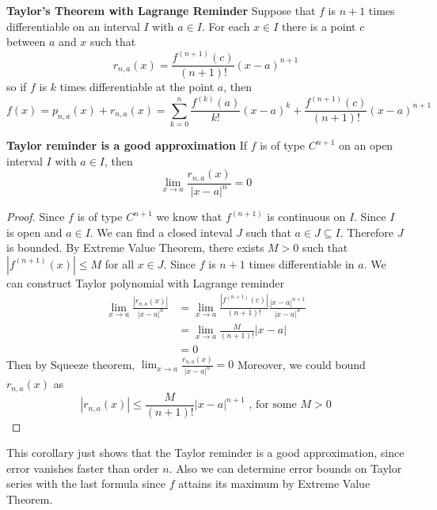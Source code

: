 \documentclass[11pt]{article}
\begin{document}
\begin{theorem*}
  \label{Taylor's Theorem with Lagrange Reminder} \textbf{Taylor's Theorem with Lagrange Reminder} Suppose that $f$ is $n+1$ times differentiable on an interval $I$ with $a\in I$. For each $x\in I$ there is a point $c$ between $a$ and $x$ such that
  \[
    r_{n,a}(x) = \frac{f^{(n+1)}(c)}{(n+1)!} (x-a)^{n+1}
  \]
  so if $f$ is $k$ times differentiable at the point $a$, then
  \[
    f(x) = p_{n, a}(x) + r_{n, a}(x) = \sum_{k=0}^{n} \frac{f^{(k)}(a)}{k!} (x-a)^k + \frac{f^{(n+1)}(c)}{(n+1)!} (x-a)^{n+1}
  \]
\end{theorem*}

\begin{corollary*}
  \textbf{Taylor reminder is a good approximation} If $f$ is of type $C^{n+1}$ on an open interval $I$ with $a\in I$, then
  \[
  \lim_{x\to a} \frac{r_{n, a}(x)}{| x-a |^n} = 0
  \]

  \begin{proof}
    Since $f$ is of type $C^{n+1}$ we know that $f^{(n+1)}$ is continuous on $I$. Since $I$ is open and $a\in I$. We can find a closed inteval $J$ such that $a\in J\subseteq I$. Therefore $J$ is bounded. By Extreme Value Theorem, there exists $M > 0$ such that $|f^{(n+1)} (x)| \leq M$ for all $x\in J$. Since $f$ is $n+1$ times differentiable in $a$. We can construct Taylor polynomial with Lagrange reminder
    \begin{align*}
      \lim_{x\to a} \frac{|r_{n, a}(x)|}{|x-a|^n}  &= \lim_{x\to a} \frac{|f^{(n+1)}(c)|}{(n+1)!} \frac{|x-a|^{n+1}}{|x-a|^n} \\
      &= \lim_{x\to a} \frac{M}{(n+1)!} |x-a| \\
      &= 0
    \end{align*}
    Then by Squeeze theorem, $\lim_{x\to a} \frac{r_{n, a}(x)}{|x-a|^n} = 0$
    Moreover, we could bound $r_{n, a}(x)$ as
    \[
      | r_{n,a}(x) | \leq \frac{M}{(n+1)!} | x-a |^{n+1} \text{ , for some } M>0
    \]
  \end{proof}
  \begin{rem}
    This corollary just shows that the Taylor reminder is a good approximation, since error vanishes faster than order $n$. Also we can determine error bounds on Taylor series with the last formula since $f$ attains its maximum by Extreme Value Theorem.
  \end{rem}

\end{corollary*}
\end{document}
